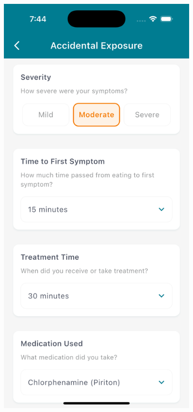 \documentclass[MScCS]{uccthesis}
\begin{document}
\begin{figure}[htbp]
\begin{minipage}[b]{0.3\textwidth}
    \end{minipage}
    \hfill
    \begin{minipage}[b]{0.3\textwidth}
        \centering
        \includegraphics[width=0.9\textwidth,height=0.4\textheight,keepaspectratio]{Figures/symptom_log_2.png}
    \end{minipage}

\end{figure}
\end{document}
